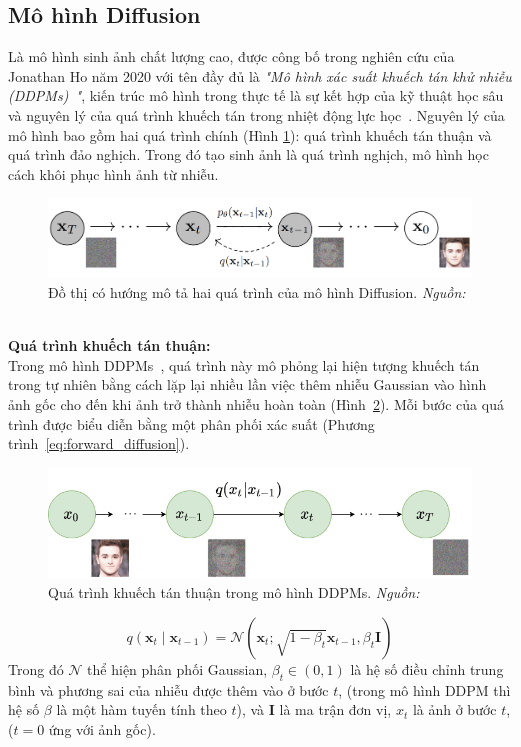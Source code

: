 \subsection{Mô hình Diffusion}
%
Là mô hình sinh ảnh chất lượng cao, được công bố trong nghiên cứu của Jonathan Ho năm 2020 với tên đầy đủ là \textit{"Mô hình xác suất khuếch tán khử nhiễu (DDPMs)~\cite{Ho2020DenoisingDP}"}, kiến trúc mô hình trong thực tế là sự kết hợp của kỹ thuật học sâu và nguyên lý của quá trình khuếch tán trong nhiệt động lực học~\cite{pmlr-v37-sohl-dickstein15}. Nguyên lý của mô hình bao gồm hai quá trình chính (Hình \ref{fig:model-diffusion-1}): quá trình khuếch tán thuận và quá trình đảo nghịch. Trong đó tạo sinh ảnh là quá trình nghịch, mô hình học cách khôi phục hình ảnh từ nhiễu.
%
\begin{figure}[htp]
	\centering
	\includegraphics[width=1.0\linewidth]{Images/model-diffusion-1.png}
	\caption{
		Đồ thị có hướng mô tả hai quá trình của mô hình Diffusion. \textit{Nguồn: \cite{Ho2020DenoisingDP}}
	}
	\label{fig:model-diffusion-1}
\end{figure}\\
%
\textbf{Quá trình khuếch tán thuận:}\\
%
Trong mô hình DDPMs~\cite{Ho2020DenoisingDP}, quá trình này mô phỏng lại hiện tượng khuếch tán trong tự nhiên bằng cách lặp lại nhiều lần việc thêm nhiễu Gaussian vào hình ảnh gốc cho đến khi ảnh trở thành nhiễu hoàn toàn (Hình~\ref{fig:model-forward-diffusion}).
%
Mỗi bước của quá trình được biểu diễn bằng một phân phối xác suất (Phương trình~\ref{eq:forward_diffusion}).
%
\begin{figure}[htp]
	\centering
	\includegraphics[width=0.8\linewidth]{Images/model-forward-diffusion.png}
	\caption{
		Quá trình khuếch tán thuận trong mô hình DDPMs. \textit{Nguồn: \cite{Ho2020DenoisingDP}}
	}
	\label{fig:model-forward-diffusion}
\end{figure}
%
\begin{equation}
	q(\mathbf{x}_t \mid \mathbf{x}_{t-1}) = \mathcal{N}(\mathbf{x}_t; \sqrt{1-\beta_t} \mathbf{x}_{t-1}, \beta_t \mathbf{I})
	\label{eq:forward_diffusion}
\end{equation}
%
Trong đó \(\mathcal{N}\) thể hiện phân phối Gaussian, \(\beta_t \in (0,1) \) là hệ số điều chỉnh trung bình và phương sai của nhiễu được thêm vào ở bước \(t\), (trong mô hình DDPM thì hệ số $\beta$ là một hàm tuyến tính theo $t$), và \(\mathbf{I}\) là ma trận đơn vị, \(x_t\) là ảnh ở bước \(t\), (\(t=0\) ứng với ảnh gốc).

